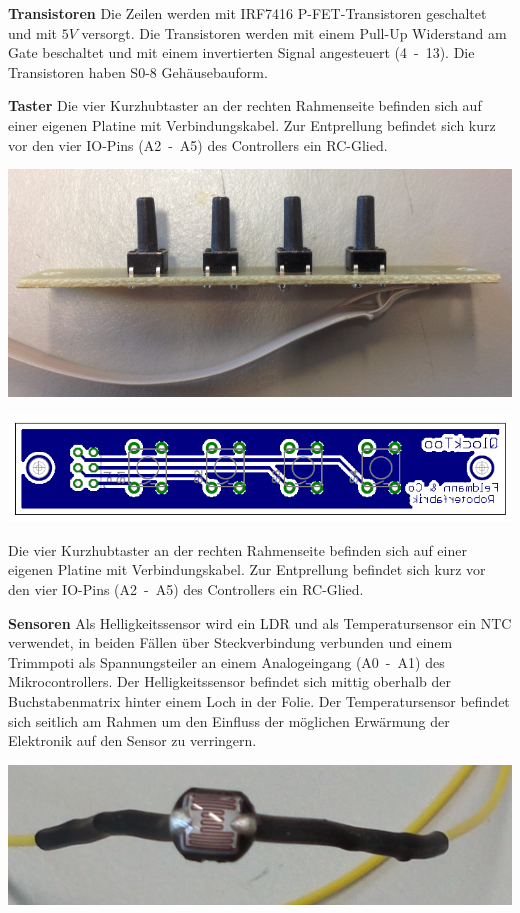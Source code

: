 \begin{multicols}{2}
\textbf{Transistoren} Die Zeilen werden mit IRF7416 P-FET-Transistoren geschaltet und mit $5V$ versorgt. Die Transistoren werden mit einem Pull-Up Widerstand am Gate beschaltet und mit einem invertierten Signal angesteuert (4~-~13). Die Transistoren haben S0-8 Gehäusebauform.

\textbf{Taster} Die vier Kurzhubtaster an der rechten Rahmenseite befinden sich auf einer eigenen Platine mit Verbindungskabel. Zur Entprellung befindet sich kurz vor den vier IO-Pins (A2~-~A5) des Controllers ein RC-Glied.

{
\centering
\includegraphics[width=0.9\columnwidth]{Abbildungen/Konstruktion/Taster02}

}

{
\centering
\includegraphics[width=0.8\columnwidth]{Abbildungen/Elektronik/Taster01}

}

Die vier Kurzhubtaster an der rechten Rahmenseite befinden sich auf einer eigenen Platine mit Verbindungskabel. Zur Entprellung befindet sich kurz vor den vier IO-Pins (A2~-~A5) des Controllers ein RC-Glied.

\textbf{Sensoren} Als Helligkeitssensor wird ein LDR und als Temperatursensor ein NTC verwendet, in beiden Fällen über Steckverbindung verbunden und einem Trimmpoti als Spannungsteiler an einem Analogeingang (A0~-~A1) des Mikrocontrollers. Der Helligkeitssensor befindet sich mittig oberhalb der Buchstabenmatrix hinter einem Loch in der Folie. Der Temperatursensor befindet sich seitlich am Rahmen um den Einfluss der möglichen Erwärmung der Elektronik auf den Sensor zu verringern. \newline

{
\centering
\includegraphics[width=0.9\columnwidth]{Abbildungen/Elektronik/LDR}

}
\end{multicols}
